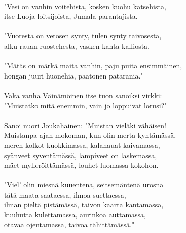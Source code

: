                                                               \\
"Vesi on vanhin voitehista, kosken kuohu katsehista,          \\
itse Luoja loitsijoista, Jumala parantajista.                 \\
                                                              \\
"Vuoresta on vetosen synty, tulen synty taivosesta,           \\
alku rauan ruostehesta, vasken kanta kalliosta.               \\
                                                              \\
"Mätäs on märkä maita vanhin, paju puita ensimmäinen,         \\
hongan juuri huonehia, paatonen patarania."                   \\
                                                              \\
Vaka vanha Väinämöinen itse tuon sanoiksi virkki:             \\
"Muistatko mitä enemmin, vain jo loppuivat lorusi?"           \\
                                                              \\
Sanoi nuori Joukahainen: "Muistan vieläki vähäisen!           \\
Muistanpa ajan mokoman, kun olin merta kyntämässä,            \\
meren kolkot kuokkimassa, kalahauat kaivamassa,               \\
syänveet syventämässä, lampiveet on laskemassa,               \\
mäet mylleröittämässä, louhet luomassa kokohon.               \\
                                                              \\
"Viel' olin miesnä kuuentena, seitsemäntenä urosna            \\
tätä maata saataessa, ilmoa suettaessa,                       \\
ilman pieltä pistämässä, taivon kaarta kantamassa,            \\
kuuhutta kulettamassa, aurinkoa auttamassa,                   \\
otavaa ojentamassa, taivoa tähittämässä."                     \\
                                                              \\
